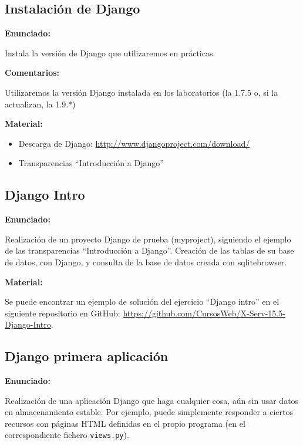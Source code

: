 \subsection{Instalación de Django}
\label{subsec:django-install}

\textbf{Enunciado:}

Instala la versión de Django que utilizaremos en prácticas.

\textbf{Comentarios:}

Utilizaremos la versión Django instalada en los laboratorios (la 1.7.5 o, si 
la actualizan, la 1.9.*)

\textbf{Material:}

\begin{itemize}
\item Descarga de Django: \url{http://www.djangoproject.com/download/}
\item Transparencias ``Introducción a Django''
\end{itemize}


\subsection{Django Intro}
\label{subsec:django-intro}

\textbf{Enunciado:}

Realización de un proyecto Django de prueba (myproject), siguiendo el ejemplo de las transparencias ``Introducción a Django''. Creación de las tablas de su base de datos, con Django, y consulta de la base de datos creada con sqlitebrowser.

\textbf{Material:}

Se puede encontrar un ejemplo de solución del ejercicio ``Django intro'' en el siguiente repositorio en GitHub: \url{https://github.com/CursosWeb/X-Serv-15.5-Django-Intro}.

\subsection{Django primera aplicación}
\label{subsec:django-primera}

\textbf{Enunciado:}

Realización de una aplicación Django que haga cualquier cosa, aún sin usar datos en almacenamiento estable. Por ejemplo, puede simplemente responder a ciertos recursos con páginas HTML definidas en el propio programa (en el correspondiente fichero \texttt{views.py}).

